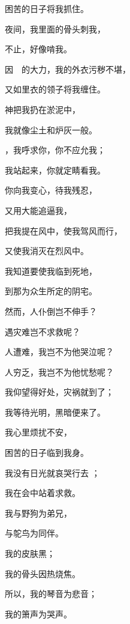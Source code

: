 {\par }{\Q 困苦的日子将我抓住。
\par }{\Q {}夜间，我里面的骨头刺我，
\par }{不止，好像啃我。
\par }{\Q {}因　{}的大力，我的外衣污秽不堪，
\par }{\Q 又如里衣的领子将我缠住。
\par }{\Q {}神把我扔在淤泥中，
\par }{\Q 我就像尘土和炉灰一般。
\par }{\Q {}，我呼求你，你不应允我；
\par }{\Q 我站起来，你就定睛看我。
\par }{\Q {}你向我变心，待我残忍，
\par }{\Q 又用大能追逼我，
\par }{\Q {}把我提在风中，使我驾风而行，
\par }{\Q 又使我消灭在烈风中。
\par }{\Q {}我知道要使我临到死地，
\par }{\Q 到那为众生所定的阴宅。
\par }{\BB \par }{\Q {}然而，人仆倒岂不伸手？
\par }{\Q 遇灾难岂不求救呢？
\par }{\Q {}人遭难，我岂不为他哭泣呢？
\par }{\Q 人穷乏，我岂不为他忧愁呢？
\par }{\Q {}我仰望得好处，灾祸就到了；
\par }{\Q 我等待光明，黑暗便来了。
\par }{\Q {}我心里烦扰不安，
\par }{\Q 困苦的日子临到我身。
\par }{\Q {}我没有日光就哀哭行去
；
\par }{\Q 我在会中站着求救。
\par }{\Q {}我与野狗为弟兄，
\par }{\Q 与鸵鸟为同伴。
\par }{\Q {}我的皮肤黑{}；
\par }{\Q 我的骨头因热烧焦。
\par }{\Q {}所以，我的琴音{}为悲音；
\par }{\Q 我的箫声{}为哭声。

}
